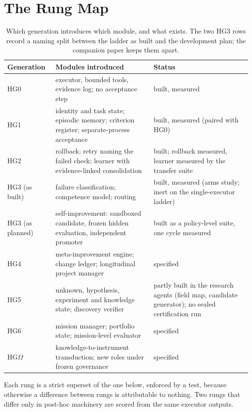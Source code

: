 \documentclass[11pt]{article}
\theoremstyle{definition}
\newcommand{\Om}{\ensuremath{\Omega}}
\begin{document}
\section{The Rung Map}\label{sec:rungs}

\begin{table}[!htbp]
\centering\small
\begin{tabularx}{\textwidth}{@{}lYY@{}}
\toprule
Generation & Modules introduced & Status \\
\midrule
HG0 & executor, bounded tools, evidence log; no acceptance step & built, measured \\
HG1 & identity and task state; episodic memory; criterion register; separate-process acceptance & built, measured (paired with HG0) \\
HG2 & rollback; retry naming the failed check; learner with evidence-linked consolidation & built; rollback measured, learner measured by the transfer suite \\
HG3 (as built) & failure classification; competence model; routing & built, measured (arms study; inert on the single-executor ladder) \\
HG3 (as planned) & self-improvement: sandboxed candidate, frozen hidden evaluation, independent promoter & built as a policy-level suite, one cycle measured \\
HG4 & meta-improvement engine; change ledger; longitudinal project manager & specified \\
HG5 & unknown, hypothesis, experiment and knowledge state; discovery verifier & partly built in the research agents (field map, candidate generator); no sealed certification run \\
HG6 & mission manager; portfolio state; mission-level evaluator & specified \\
HG\Om{} & knowledge-to-instrument transduction; new roles under frozen governance & specified \\
\bottomrule
\end{tabularx}
\caption{Which generation introduces which module, and what exists. The two HG3 rows record a naming split between the ladder as built and the development plan; the companion paper keeps them apart.}
\label{tab:rungs}
\end{table}

Each rung is a strict superset of the one below, enforced by a test, because otherwise a difference between rungs is attributable to nothing. Two rungs that differ only in post-hoc machinery are scored from the same executor outputs.
\end{document}
